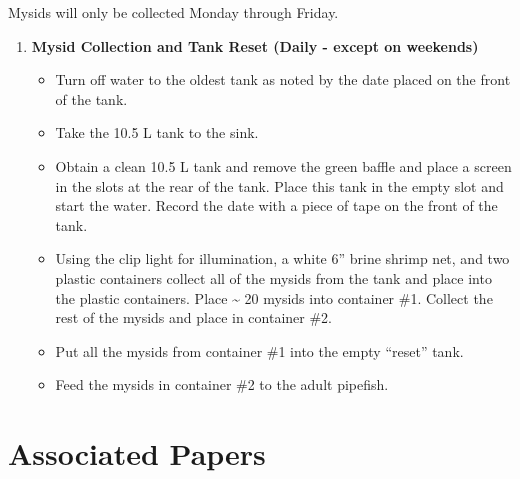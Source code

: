 \documentclass[
  letterpaper,
  DIV=11,
  numbers=noendperiod]{scrreprt}
\providecommand{\tightlist}{%
  \setlength{\itemsep}{0pt}\setlength{\parskip}{0pt}}\usepackage{longtable,booktabs,array}
\begin{document}
\begin{tcolorbox}[enhanced jigsaw, toprule=.15mm, breakable, coltitle=black, leftrule=.75mm, title=\textcolor{quarto-callout-note-color}{\faInfo}\hspace{0.5em}{This is a callout NOTE}, bottomrule=.15mm, toptitle=1mm, bottomtitle=1mm, colframe=quarto-callout-note-color-frame, opacityback=0, colback=white, opacitybacktitle=0.6, colbacktitle=quarto-callout-note-color!10!white, rightrule=.15mm, titlerule=0mm, arc=.35mm, left=2mm]

Mysids will only be collected Monday through Friday.

\end{tcolorbox}

\begin{enumerate}
\def\labelenumi{\arabic{enumi}.}
\setcounter{enumi}{2}
\tightlist
\item
  \textbf{Mysid Collection and Tank Reset (Daily - except on weekends)}

  \begin{itemize}
  \tightlist
  \item
    Turn off water to the oldest tank as noted by the date placed on the
    front of the tank.
  \item
    Take the 10.5 L tank to the sink.
  \item
    Obtain a clean 10.5 L tank and remove the green baffle and place a
    screen in the slots at the rear of the tank. Place this tank in the
    empty slot and start the water. Record the date with a piece of tape
    on the front of the tank.
  \item
    Using the clip light for illumination, a white 6'' brine shrimp net,
    and two plastic containers collect all of the mysids from the tank
    and place into the plastic containers. Place \textasciitilde{} 20
    mysids into container \#1. Collect the rest of the mysids and place
    in container \#2.
  \item
    Put all the mysids from container \#1 into the empty ``reset'' tank.
  \item
    Feed the mysids in container \#2 to the adult pipefish.
  \end{itemize}
\end{enumerate}

\hypertarget{associated-papers-23}{%
\section{Associated Papers}\label{associated-papers-23}}
\end{document}
